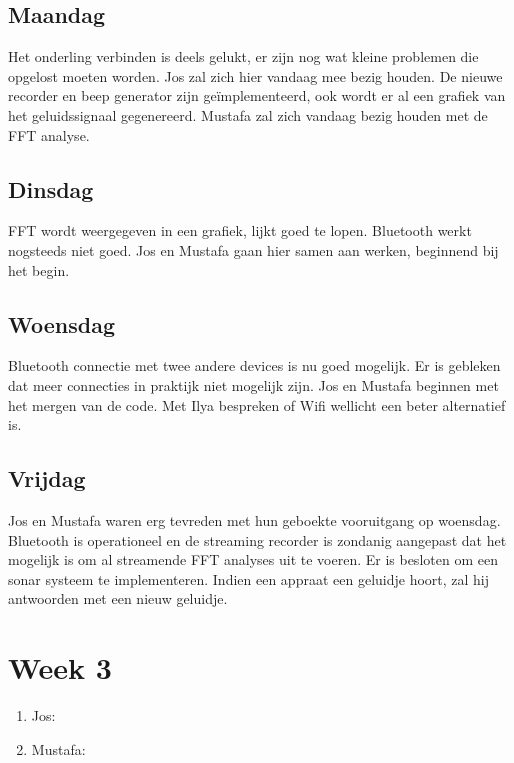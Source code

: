 \documentclass[12pt]{article}
\begin{document}
\subsection*{Maandag}
Het onderling verbinden is deels gelukt, er zijn nog wat kleine problemen die opgelost moeten worden. Jos zal zich hier vandaag mee bezig houden. De nieuwe recorder en beep generator zijn ge\"implementeerd, ook wordt er al een grafiek van het geluidssignaal gegenereerd. Mustafa zal zich vandaag bezig houden met de FFT analyse.
\subsection*{Dinsdag}
FFT wordt weergegeven in een grafiek, lijkt goed te lopen. Bluetooth werkt nogsteeds niet goed. Jos en Mustafa gaan hier samen aan werken, beginnend bij het begin.
\subsection*{Woensdag}
Bluetooth connectie met twee andere devices is nu goed mogelijk. Er is gebleken dat meer connecties in praktijk niet mogelijk zijn. Jos en Mustafa beginnen met het mergen van de code. Met Ilya bespreken of Wifi wellicht een beter alternatief is.
\subsection*{Vrijdag}
Jos en Mustafa waren erg tevreden met hun geboekte vooruitgang op woensdag. Bluetooth is operationeel en de streaming recorder is zondanig aangepast dat het mogelijk is om al streamende FFT analyses uit te voeren. Er is besloten om een sonar systeem te implementeren. Indien een appraat een geluidje hoort, zal hij antwoorden met een nieuw geluidje. 

\section*{Week 3}
\begin{enumerate}
\item Jos:
\item Mustafa:
\end{enumerate}
\end{document}
